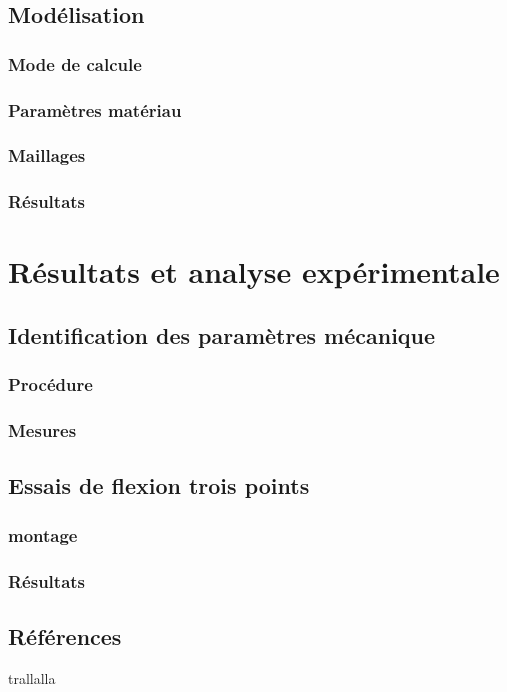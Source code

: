 \documentclass[12pt]{report}
\begin{document}
\chapter{Modélisation}
\section{Mode de calcule}


\section{Paramètres matériau}


\section{Maillages}


\section{Résultats}


\part{Résultats et analyse expérimentale}
\chapter*{}


\chapter{Identification des paramètres mécanique}
\section{Procédure}


\section{Mesures}


\chapter{Essais de flexion trois points}
\section{montage}


\section{Résultats}


\chapter*{Références}
trallalla
\end{document}
